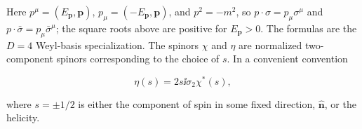 Here $p^\mu=(E_{\mathbf p},\mathbf p)$, $p_\mu=(-E_{\mathbf p},\mathbf p)$,
and $p^2=-m^2$, so $p\cdot\sigma=p_\mu\sigma^\mu$ and
$p\cdot\bar\sigma=p_\mu\bar\sigma^\mu$; the square roots above are
positive for $E_{\mathbf p}>0$. The formulas are the $D=4$ Weyl-basis
specialization. The spinors $\chi$ and $\eta$ are normalized two-component
spinors corresponding to the choice of $s$.
In a convenient convention

\[
\eta(s)=2s\ii\sigma_2\chi^*(s),
\]

where $s=\pm1/2$ is either the component of spin in some fixed direction, $\widehat{\mathbf n}$, or the
helicity.
